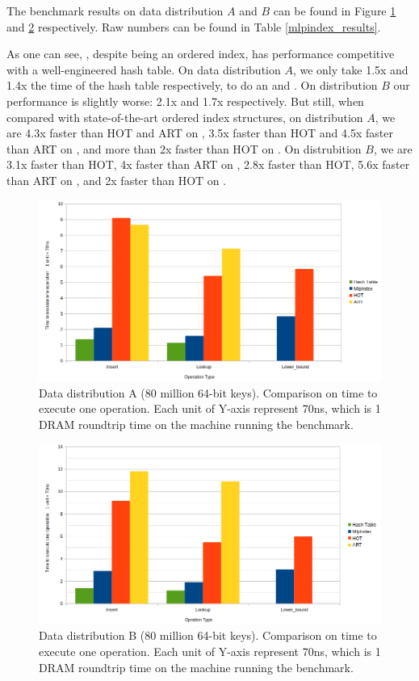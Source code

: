 \documentclass[11pt, usletter]{article}
\begin{document}
The benchmark results on data distribution $A$ and $B$ can be found in Figure \ref{mlpindex_distA} and \ref{mlpindex_distB} respectively.
Raw numbers can be found in Table \ref{mlpindex_results}.

As one can see, \MlpIndex, despite being an ordered index, has performance competitive with a well-engineered hash table.
On data distribution $A$, we only take 1.5x and 1.4x the time of the hash table respectively, to do an \insertion and \lookup. 
On distribution $B$ our performance is slightly worse: 2.1x and 1.7x respectively. 
But still, when compared with state-of-the-art ordered index structures, 
on distribution $A$, we are 4.3x faster than HOT and ART on \insertion, 
3.5x faster than HOT and 4.5x faster than ART on \lookup, 
and more than 2x faster than HOT on \lowerbound. 
On distrubition $B$, we are 3.1x faster than HOT, 4x faster than ART on \insertion, 
2.8x faster than HOT, 5.6x faster than ART on \lookup, 
and 2x faster than HOT on \lowerbound.

\begin{figure}[!htb]
\centering
  \includegraphics[width=0.8\linewidth]{mlpindex_result1.png}
\caption{Data distribution A (80 million 64-bit keys). Comparison on time to execute one operation. 
Each unit of Y-axis represent 70ns, which is 1 DRAM roundtrip time on the machine running the benchmark.}
\label{mlpindex_distA}
\end{figure}

\begin{figure}[!htb]
\centering
  \includegraphics[width=0.8\linewidth]{mlpindex_result2.png}
\caption{Data distribution B (80 million 64-bit keys). Comparison on time to execute one operation. 
Each unit of Y-axis represent 70ns, which is 1 DRAM roundtrip time on the machine running the benchmark.}
\label{mlpindex_distB}
\end{figure}
\end{document}
